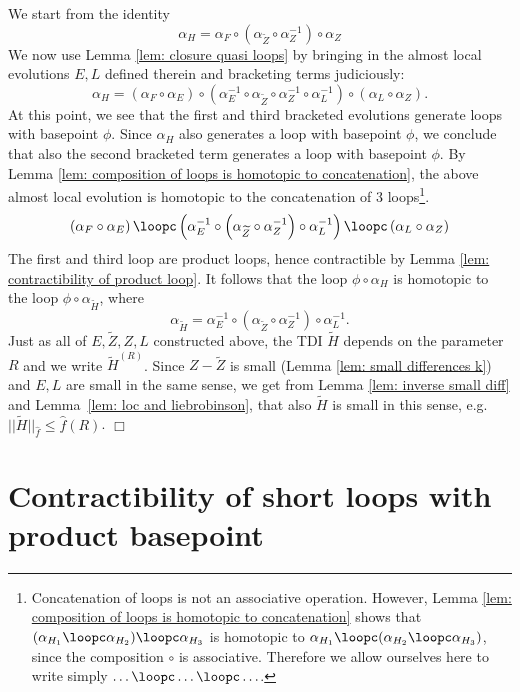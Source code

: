 We start from the identity
$$
\alpha_H=  \alpha_{F} \circ  \left(\alpha_{\widetilde Z} \circ \alpha^{-1}_Z\right) \circ \alpha_Z
$$
We now use Lemma \ref{lem: closure quasi loops} by bringing in the almost local evolutions $E,L$ defined therein and  bracketing terms judiciously:
$$
\alpha_H=   \left(\alpha_{F} \circ \alpha_E\right)   \circ  \left(\alpha^{-1}_E \circ  \alpha_{\widetilde Z} \circ \alpha^{-1}_Z \circ \alpha^{-1}_L\right) \circ \left(\alpha_L \circ \alpha_Z\right).
$$ 
At this point, we see that the first and third bracketed evolutions generate loops with basepoint $\phi$. Since $\alpha_H$ also generates a loop with basepoint $\phi$, we conclude that also the second bracketed term generates a loop with basepoint $\phi$. By Lemma \ref{lem: composition of loops is homotopic to concatenation},  the above almost local evolution is homotopic to the concatenation of 3 loops\footnote{Concatenation of loops is not an associative operation. However, Lemma \ref{lem: composition of loops is homotopic to concatenation} shows that $(\alpha_{H_1}\loopc\alpha_{H_2})\loopc \alpha_{H_3}$ is homotopic to $\alpha_{H_1}\loopc(\alpha_{H_2}\loopc \alpha_{H_3})$, since the composition $\circ$ is associative. Therefore we allow ourselves here to write simply $\ldots\loopc\ldots\loopc\ldots$.}.
$$
\left( \alpha_{F} \circ \alpha_E \right) \loopc \left(\alpha^{-1}_E \circ  \left(\alpha_{\widetilde Z} \circ \alpha^{-1}_Z\right) \circ \alpha^{-1}_L\right) \loopc\left( \alpha_L \circ \alpha_Z \right)
$$
The first and third loop are product loops, hence contractible by Lemma \ref{lem: contractibility of product loop}. It follows that the loop $\phi\circ \alpha_H$ is homotopic to the loop $\phi\circ \alpha_{\widetilde H}$, where
$$
\alpha_{\widetilde H}=\alpha^{-1}_E \circ  \left(\alpha_{\widetilde Z} \circ \alpha^{-1}_Z\right) \circ \alpha^{-1}_L.
$$
Just as all of $E,\widetilde Z,Z,L$ constructed above, the  TDI $\widetilde H$ depends on the parameter $R$ and we write $\widetilde H^{(R)}$. 
Since $Z-\widetilde Z$ is small (Lemma \ref{lem: small differences k}) and $E,L$ are small in the same sense, we get from Lemma \ref{lem: inverse small diff} and Lemma~\ref{lem: loc and liebrobinson}, that also $\widetilde H$ is small in this sense, e.g.\ 
$||\widetilde H||_{\hat{f}}\leq \hat{f}(R)$. 
\hfill \ensuremath{\Box}

\section{Contractibility of short loops with product basepoint}\label{sec: contractibility of short loops with product basepoint}


